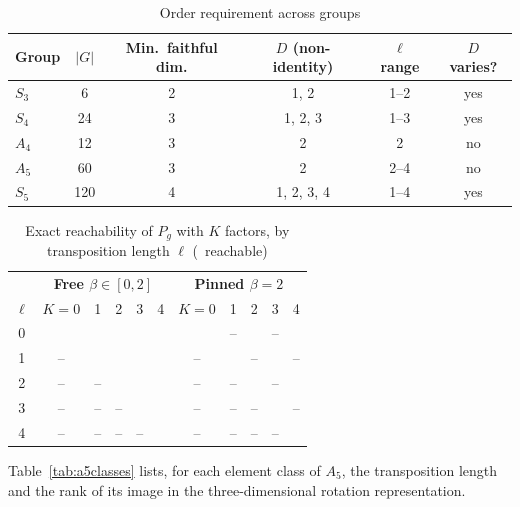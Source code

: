 \begin{table}[ht]
	\caption{Order requirement across groups}
	\centering
	\begin{tabular}{l c c c c c}
		\toprule
		\textbf{Group} & $|G|$ & \textbf{Min.\ faithful dim.} & \textbf{$D$ (non-identity)} & \textbf{$\ell$ range} & \textbf{$D$ varies?} \\
		\midrule
		$S_3$ & 6   & 2 & 1, 2       & 1--2 & yes \\
		$S_4$ & 24  & 3 & 1, 2, 3    & 1--3 & yes \\
		$A_4$ & 12  & 3 & 2          & 2    & no \\
		$A_5$ & 60  & 3 & 2          & 2--4 & no \\
		$S_5$ & 120 & 4 & 1, 2, 3, 4 & 1--4 & yes \\
		\bottomrule
	\end{tabular}
	\label{tab:groups}
\end{table}

\begin{table}[ht]
	\caption{Exact reachability of $P_g$ with $K$ factors, by transposition length $\ell$ (\checkmark\ reachable)}
	\centering
	\begin{tabular}{c | c c c c c | c c c c c}
		\toprule
		 & \multicolumn{5}{c|}{\textbf{Free $\beta \in [0,2]$}} & \multicolumn{5}{c}{\textbf{Pinned $\beta = 2$}} \\
		$\ell$ & $K{=}0$ & 1 & 2 & 3 & 4 & $K{=}0$ & 1 & 2 & 3 & 4 \\
		\midrule
		0 & \checkmark & \checkmark & \checkmark & \checkmark & \checkmark & \checkmark & -- & \checkmark & -- & \checkmark \\
		1 & -- & \checkmark & \checkmark & \checkmark & \checkmark & -- & \checkmark & -- & \checkmark & -- \\
		2 & -- & -- & \checkmark & \checkmark & \checkmark & -- & -- & \checkmark & -- & \checkmark \\
		3 & -- & -- & -- & \checkmark & \checkmark & -- & -- & -- & \checkmark & -- \\
		4 & -- & -- & -- & -- & \checkmark & -- & -- & -- & -- & \checkmark \\
		\bottomrule
	\end{tabular}
	\label{tab:reach}
\end{table}

\FloatBarrier
Table~\ref{tab:a5classes} lists, for each element class of $A_5$, the transposition length and the rank of its image in the three-dimensional rotation representation.

